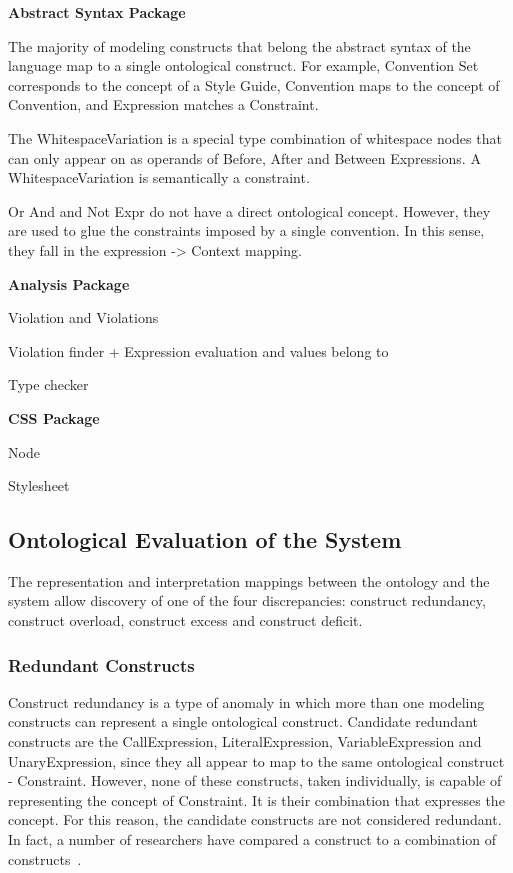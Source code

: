\documentclass[parskip=full]{uvamscse}
\begin{document}
\textbf{Abstract Syntax Package}

The majority of modeling constructs that belong the abstract syntax of the language map to a single ontological construct. For example, Convention Set corresponds to the concept of a Style Guide, Convention maps to the concept of Convention, and Expression matches a Constraint.

The WhitespaceVariation is a special type combination of whitespace nodes that can only appear on
as operands of Before, After and Between Expressions. A WhitespaceVariation is semantically a constraint.

Or And and Not Expr do not have a direct ontological concept. However, they are used to glue the
constraints imposed by a single convention. In this sense, they fall in the expression -> Context
mapping.

\textbf{Analysis Package}

Violation and Violations

Violation finder + Expression evaluation and values belong to

Type checker 

\textbf{CSS Package}

Node 

Stylesheet

\subsection{Ontological Evaluation of the System}

The representation and interpretation mappings between the ontology and the system allow discovery
of one of the four discrepancies: construct redundancy, construct overload, construct excess and
construct deficit.

\subsubsection{Redundant Constructs} 

Construct redundancy is a type of anomaly in which more than one modeling constructs can represent a
single ontological construct. Candidate redundant constructs are the CallExpression,
LiteralExpression, VariableExpression and UnaryExpression, since they all appear to map to the same
ontological construct - Constraint. However, none of these constructs, taken individually, is
capable of representing the concept of Constraint. It is their combination that expresses the
concept. For this reason, the candidate constructs are not considered redundant. In fact, a number
of researchers have compared a construct to a combination of constructs~\cite{gehlert2007toward}.
\end{document}
